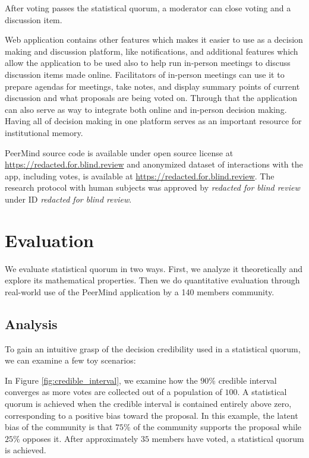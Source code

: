 \documentclass[format=acmsmall, review=true, screen=true, anonymous=true]{acmart}
\begin{document}
After voting passes the statistical quorum, a moderator can close voting and a discussion item.

Web application contains other features which makes it easier to use as a decision making and discussion
platform, like notifications, and additional features which allow the application to be used also to
help run in-person meetings to discuss discussion items made
online. Facilitators of in-person meetings can use it to prepare agendas for meetings, take notes,
and display summary points of current discussion and what proposals are being voted on. Through that the
application can also serve as way to integrate both online and in-person decision making. Having all of
decision making in one platform serves as an important resource for institutional memory.

PeerMind source code is available under open source license at \url{https://redacted.for.blind.review} and
anonymized dataset of interactions with the app, including votes, is available at \url{https://redacted.for.blind.review}.
The research protocol with human subjects was approved by \emph{redacted for blind review} under
ID \emph{redacted for blind review}.

\section{Evaluation}
\label{sec:evaluation}

We evaluate statistical quorum in two ways. First, we analyze it theoretically and explore its mathematical properties.
Then we do quantitative
evaluation through real-world use of the PeerMind application by a 140 members
community.

\subsection{Analysis}


To gain an intuitive grasp of the decision credibility used in a statistical quorum, we can examine a few toy scenarios:

In Figure \ref{fig:credible_interval}, we examine how the $90\%$ credible interval converges as more votes are collected out of a population of $100$.  A statistical quorum is achieved when the credible interval is contained entirely above zero, corresponding to a positive bias toward the proposal.  In this example, the latent bias of the community is that $75\%$ of the community supports the proposal while $25\%$ opposes it.  After approximately $35$ members have voted, a statistical quorum is achieved.
\end{document}

